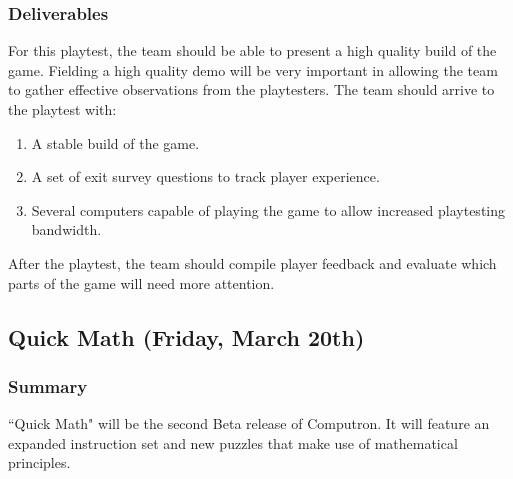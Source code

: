 \subsubsection*{Deliverables}
For this playtest, the team should be able to present a high quality build of the game. 
Fielding a high quality demo will be very important in allowing the team to gather effective 
observations from the playtesters. The team should arrive to the playtest with:
\begin{enumerate}
	\item A stable build of the game.
	\item A set of exit survey questions to track player experience.
	\item Several computers capable of playing the game to allow increased playtesting 
	bandwidth.
\end{enumerate}

After the playtest, the team should compile player feedback and evaluate which parts 
of the game will need more attention.

\subsection{Quick Math (Friday, March 20th)}

\subsubsection*{Summary}
``Quick Math" will be the second Beta release of Computron. It will feature an expanded 
instruction set and new puzzles that make use of mathematical principles. 

